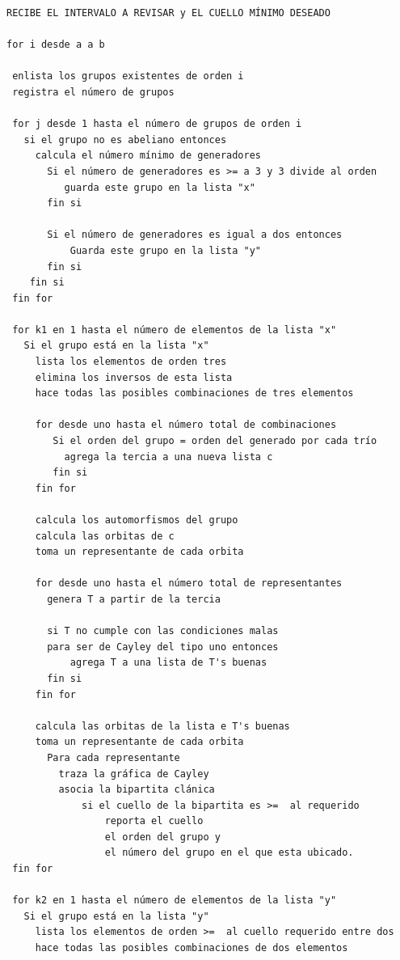 \documentclass[12pt]{book}
\theoremstyle{definition}
\begin{document}
\begin{small}
\begin{verbatim}
RECIBE EL INTERVALO A REVISAR y EL CUELLO MÍNIMO DESEADO
 
for i desde a a b

 enlista los grupos existentes de orden i
 registra el número de grupos
     
 for j desde 1 hasta el número de grupos de orden i
   si el grupo no es abeliano entonces
     calcula el número mínimo de generadores             
       Si el número de generadores es >= a 3 y 3 divide al orden     
          guarda este grupo en la lista "x"
       fin si  
 
       Si el número de generadores es igual a dos entonces 
           Guarda este grupo en la lista "y"
       fin si  
    fin si            
 fin for   
    
 for k1 en 1 hasta el número de elementos de la lista "x"
   Si el grupo está en la lista "x"
     lista los elementos de orden tres
     elimina los inversos de esta lista 
     hace todas las posibles combinaciones de tres elementos     
  
     for desde uno hasta el número total de combinaciones
        Si el orden del grupo = orden del generado por cada trío     
          agrega la tercia a una nueva lista c
        fin si
     fin for    
                                 
     calcula los automorfismos del grupo
     calcula las orbitas de c 
     toma un representante de cada orbita

     for desde uno hasta el número total de representantes
       genera T a partir de la tercia

       si T no cumple con las condiciones malas 
       para ser de Cayley del tipo uno entonces
           agrega T a una lista de T's buenas
       fin si 
     fin for 

     calcula las orbitas de la lista e T's buenas
     toma un representante de cada orbita  
       Para cada representante 
         traza la gráfica de Cayley
         asocia la bipartita clánica              
             si el cuello de la bipartita es >=  al requerido
                 reporta el cuello 
                 el orden del grupo y 
                 el número del grupo en el que esta ubicado.       
 fin for

 for k2 en 1 hasta el número de elementos de la lista "y"
   Si el grupo está en la lista "y"
     lista los elementos de orden >=  al cuello requerido entre dos
     hace todas las posibles combinaciones de dos elementos      
                 

\end{verbatim}
\end{small}
\end{document}
